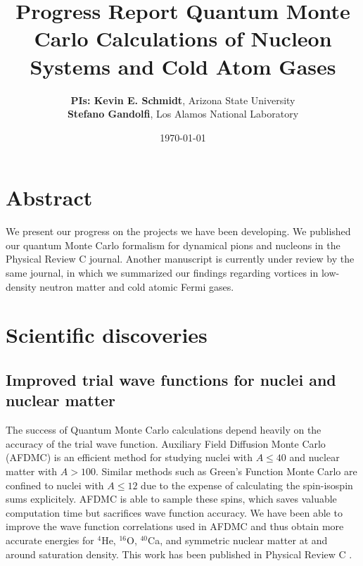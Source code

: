 \documentclass[12pt,letterpaper]{article}
\newcommand{\project}{\large Progress Report \vskip 0.1cm}
\begin{document}
\onehalfspacing
\title{\project {\Large \textbf{Quantum Monte Carlo Calculations of Nucleon 
Systems and Cold Atom Gases}} \vspace{-0.5cm}}
\author{
{\bf PIs: Kevin E. Schmidt}, Arizona State University \\
{\bf Stefano Gandolfi}, Los Alamos National Laboratory
}
\date{\today}
\maketitle

\vspace{-1.5cm}
\section*{Abstract}

We present our progress on the projects we have been developing.
We published our
quantum Monte Carlo formalism for dynamical pions and nucleons
in the
Physical 
Review C journal.
Another manuscript is currently under review by the same journal,
in which
we summarized
our findings regarding vortices in low-density neutron matter
and cold atomic Fermi gases.

\section{Scientific discoveries}%

\subsection{Improved trial wave functions for nuclei and nuclear matter}
The success of Quantum Monte Carlo calculations depend heavily on the accuracy of the trial wave function. Auxiliary Field Diffusion Monte Carlo (AFDMC) is an efficient method for studying nuclei with $A\le40$ and nuclear matter with $A>100$. Similar methods such as Green's Function Monte Carlo are confined to nuclei with $A\le12$ due to the expense of calculating the spin-isospin sums explicitely. AFDMC is able to sample these spins, which saves valuable computation time but sacrifices wave function accuracy. We have been able to improve the wave function correlations used in AFDMC and thus obtain more accurate energies for $^4$He, $^{16}$O, $^{40}$Ca, and symmetric nuclear matter at and around saturation density. This work has been published in Physical Review C \cite{lon18}.
\end{document}
